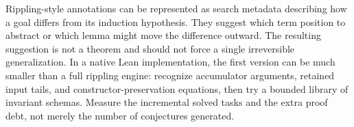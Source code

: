 Rippling-style annotations can be represented as search metadata describing how a goal differs from its induction hypothesis. They suggest which term position to abstract or which lemma might move the difference outward. The resulting suggestion is not a theorem and should not force a single irreversible generalization. In a native Lean implementation, the first version can be much smaller than a full rippling engine: recognize accumulator arguments, retained input tails, and constructor-preservation equations, then try a bounded library of invariant schemas. Measure the incremental solved tasks and the extra proof debt, not merely the number of conjectures generated.
